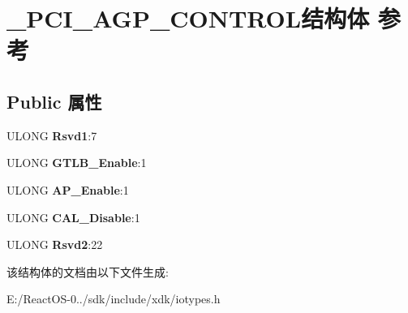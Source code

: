 \hypertarget{struct___p_c_i___a_g_p___c_o_n_t_r_o_l}{}\section{\+\_\+\+P\+C\+I\+\_\+\+A\+G\+P\+\_\+\+C\+O\+N\+T\+R\+O\+L结构体 参考}
\label{struct___p_c_i___a_g_p___c_o_n_t_r_o_l}
\subsection*{Public 属性}
\begin{DoxyCompactItemize}
\item 
\mbox{\label{struct___p_c_i___a_g_p___c_o_n_t_r_o_l_a11363a25fd996e2fb7d58244554a65b6}} 
U\+L\+O\+NG {\bfseries Rsvd1}\+:7
\item 
\mbox{\label{struct___p_c_i___a_g_p___c_o_n_t_r_o_l_aded2df9f691f010b328ceee83d2fc991}} 
U\+L\+O\+NG {\bfseries G\+T\+L\+B\+\_\+\+Enable}\+:1
\item 
\mbox{\label{struct___p_c_i___a_g_p___c_o_n_t_r_o_l_ac336d942cebe3295a293517e37a17be3}} 
U\+L\+O\+NG {\bfseries A\+P\+\_\+\+Enable}\+:1
\item 
\mbox{\label{struct___p_c_i___a_g_p___c_o_n_t_r_o_l_aeaa06e25e59de3df098f2eb3b5f64838}} 
U\+L\+O\+NG {\bfseries C\+A\+L\+\_\+\+Disable}\+:1
\item 
\mbox{\label{struct___p_c_i___a_g_p___c_o_n_t_r_o_l_a2c610f6b087dd28e515bf5d746a98c2c}} 
U\+L\+O\+NG {\bfseries Rsvd2}\+:22
\end{DoxyCompactItemize}


该结构体的文档由以下文件生成\+:\begin{DoxyCompactItemize}
\item 
E\+:/\+React\+O\+S-\/0../sdk/include/xdk/iotypes.\+h\end{DoxyCompactItemize}
